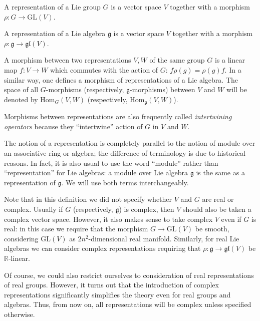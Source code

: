 \documentclass{report}
\begin{document}
\begin{definition}
    A representation of a Lie group \( G \) is a vector space \( V \) together with a morphism \( \rho : G \to \mathrm{GL}(V) \).
    
    A representation of a Lie algebra \( \mathfrak{g} \) is a vector space \( V \) together with a morphism \( \rho : \mathfrak{g} \to \mathfrak{gl}(V) \).
    
    A morphism between two representations \( V, W \) of the same group \( G \) is a linear map \( f : V \to W \) which commutes with the action of \( G \): \( f \rho(g) = \rho(g)f \). In a similar way, one defines a morphism of representations of a Lie algebra. The space of all \( G \)-morphisms (respectively, \( \mathfrak{g} \)-morphisms) between \( V \) and \( W \) will be denoted by \( \mathrm{Hom}_G(V, W) \) (respectively, \( \mathrm{Hom}_{\mathfrak{g}}(V, W) \)).
\end{definition}
    
\begin{remark}
Morphisms between representations are also frequently called \textit{intertwining operators} because they ``intertwine'' action of \( G \) in \( V \) and \( W \).
\end{remark}

The notion of a representation is completely parallel to the notion of module over an associative ring or algebra; the difference of terminology is due to historical reasons. In fact, it is also usual to use the word ``module'' rather than ``representation'' for Lie algebras: a module over Lie algebra \( \mathfrak{g} \) is the same as a representation of \( \mathfrak{g} \). We will use both terms interchangeably.

Note that in this definition we did not specify whether \( V \) and \( G \) are real or complex. Usually if \( G \) (respectively, \( \mathfrak{g} \)) is complex, then \( V \) should also be taken a complex vector space. However, it also makes sense to take complex \( V \) even if \( G \) is real: in this case we require that the morphism \( G \to \mathrm{GL}(V) \) be smooth, considering \( \mathrm{GL}(V) \) as \( 2n^2 \)-dimensional real manifold. Similarly, for real Lie algebras we can consider complex representations requiring that \( \rho : \mathfrak{g} \to \mathfrak{gl}(V) \) be \( \mathbb{R} \)-linear.
    
Of course, we could also restrict ourselves to consideration of real representations of real groups. However, it turns out that the introduction of complex representations significantly simplifies the theory even for real groups and algebras. Thus, from now on, all representations will be complex unless specified otherwise.
    
\end{document}
